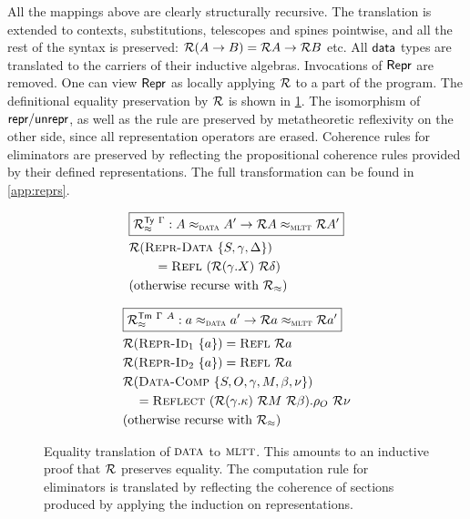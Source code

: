 All the mappings above are clearly structurally recursive.
The translation is extended to contexts, substitutions, telescopes and spines
pointwise, and all the rest of the syntax is preserved: $\mathcal{R}(A \to B) = \mathcal{R} A \to
\mathcal{R} B$ etc. All $\textsf{data}$ types are translated to the carriers of their inductive
algebras. Invocations of $\textsf{Repr}$ are removed. One can view $\textsf{Repr}$ as locally
applying $\mathcal{R}$ to a part of the program.
The definitional equality preservation by $\mathcal{R}$ is shown in \cref{fig:translation-eq}.
The isomorphism of $\textsf{repr}/\textsf{unrepr}$, as well as the rule  are
preserved by metatheoretic reflexivity on the other side, since all
representation operators are erased. Coherence rules for eliminators are
preserved by reflecting the propositional coherence rules provided by their
defined representations.
The full transformation can be found in \cref{app:reprs}.

\begin{figure}[H]
\begin{minipage}[t]{0.45\textwidth}
\begin{align*}
&\boxed{\mathcal{R}_{\approx}^{\textsf{Ty}\ \Gamma} : A \approx_{{\textsc{data}}} A' \to \mathcal{R} A \approx_{{\textsc{mltt}}} \mathcal{R} A'} \\
&\mathcal{R} (\textsc{Repr-Data}\ \{S, \gamma, \Delta\}) \\ &\qquad = \textsc{Refl}\ (\mathcal{R}(\gamma.X)\ \mathcal{R} \delta) \\
&\text{(otherwise recurse with $\mathcal{R}_{\approx}$)}
\end{align*}
\end{minipage}\hspace{\fill}%
\begin{minipage}[t]{0.45\textwidth}
\begin{align*}
&\boxed{\mathcal{R}_{\approx}^{\textsf{Tm}\ \Gamma\ A} : a \approx_{{\textsc{data}}} a' \to \mathcal{R} a \approx_{{\textsc{mltt}}} \mathcal{R} a'} \\
&\mathcal{R} (\textsc{Repr-Id}_1\ \{a\}) = \textsc{Refl}\ \mathcal{R} a \\
&\mathcal{R} (\textsc{Repr-Id}_2\ \{a\}) = \textsc{Refl}\ \mathcal{R} a \\
&\mathcal{R} (\textsc{Data-Comp}\ \{S, O, \gamma, M, \beta, \nu\})  \\
&\quad = \textsc{Reflect}\ (\mathcal{R} (\gamma.\kappa)\ \mathcal{R} M\ \mathcal{R} \beta).\rho_O\ \mathcal{R}\nu \\
&\text{(otherwise recurse with $\mathcal{R}_\approx$)}
\end{align*}
\end{minipage}
\caption{Equality translation of ${\textsc{data}}$ to ${\textsc{mltt}}$. This amounts to
an inductive proof that $\mathcal{R}$ preserves equality. The computation rule for
eliminators is translated by reflecting the coherence of sections produced by
applying the induction on representations.}
\label{fig:translation-eq}
\end{figure}

